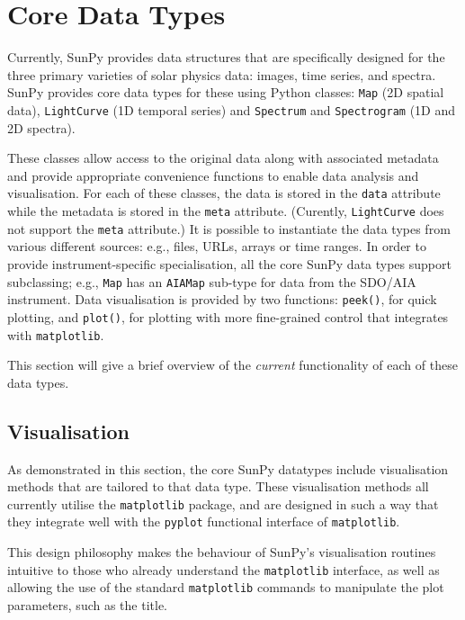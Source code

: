 \section{Core Data Types}\label{sec:DataTypes}

Currently, SunPy provides data structures that are specifically designed for the
three primary varieties of solar physics data: images, time series, and
spectra. SunPy provides core data types for these using Python classes:
\texttt{Map} (2D spatial data), \texttt{LightCurve} (1D temporal series)
and \texttt{Spectrum} and \texttt{Spectrogram} (1D and 2D spectra). 

These classes allow access to the original data
along with associated metadata and provide appropriate convenience functions to
enable data analysis and visualisation. For each of these classes, the data is
stored in the \texttt{data} attribute while the metadata is stored 
in the \texttt{meta} attribute. (Curently, \texttt{LightCurve} does 
not support the \texttt{meta} attribute.) It is possible to instantiate the
data types from various
different sources: e.g., files, URLs, arrays or time ranges.  In order 
to provide instrument-specific specialisation, all the core SunPy data types 
support subclassing; e.g., \texttt{Map} has an \texttt{AIAMap} 
sub-type for data from the SDO/AIA instrument. 
Data visualisation is provided by two functions: \texttt{peek()}, for quick 
plotting, and \texttt{plot()}, for plotting with more fine-grained control that 
integrates with \texttt{matplotlib}.


This section will give a brief overview of the \textit{current} functionality 
of each of these data types.





\subsection{Visualisation}
\label{subsec:Viz}
As demonstrated in this section, the core SunPy datatypes 
include visualisation methods that are tailored to that data type. 
These visualisation methods all currently utilise the \texttt{matplotlib} 
package, and are designed in such a way that they integrate well with 
the \texttt{pyplot} functional interface of \texttt{matplotlib}.

This design philosophy makes the behaviour of SunPy's visualisation 
routines intuitive to those who already understand the \texttt{matplotlib}
interface, as well as allowing the use of the standard 
\texttt{matplotlib} commands to manipulate the plot parameters, such as the 
title.